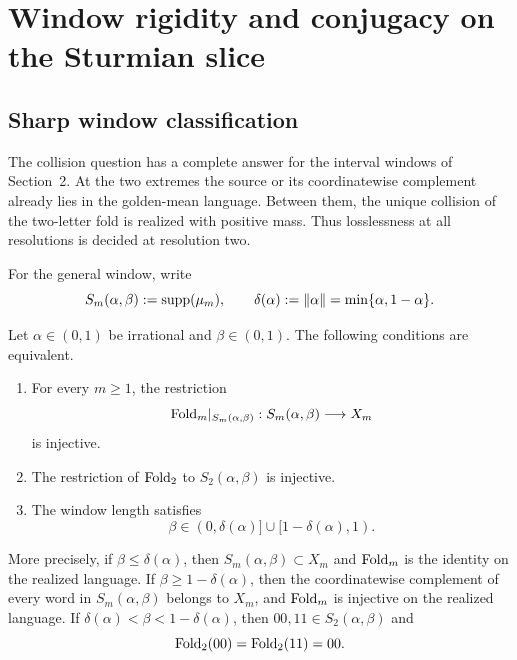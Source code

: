 \section{Window rigidity and conjugacy on the Sturmian slice}

\subsection{Sharp window classification}

The collision question has a complete answer for the interval windows of
Section~2.  At the two extremes the source or its coordinatewise complement
already lies in the golden-mean language.  Between them, the unique collision
of the two-letter fold is realized with positive mass.  Thus losslessness at
all resolutions is decided at resolution two.

For the general window, write
\[
S_m(\alpha,\beta):=\operatorname{supp}(\mu_m),
\qquad
\delta(\alpha):=\|\alpha\|=\min\{\alpha,1-\alpha\}.
\]

\begin{theorem}
\label{thm:window-injectivity-classification}
Let \(\alpha\in(0,1)\) be irrational and \(\beta\in(0,1)\).  The following
conditions are equivalent.
\begin{enumerate}
\item For every \(m\ge1\), the restriction
\[
\mathrm{Fold}_m|_{S_m(\alpha,\beta)}:S_m(\alpha,\beta)\longrightarrow X_m
\]
is injective.
\item The restriction of \(\mathrm{Fold}_2\) to \(S_2(\alpha,\beta)\) is injective.
\item The window length satisfies
\[
\beta\in(0,\delta(\alpha)]\cup[1-\delta(\alpha),1).
\]
\end{enumerate}
More precisely, if \(\beta\le\delta(\alpha)\), then
\(S_m(\alpha,\beta)\subset X_m\) and \(\mathrm{Fold}_m\) is the identity on the
realized language.  If \(\beta\ge1-\delta(\alpha)\), then the coordinatewise
complement of every word in \(S_m(\alpha,\beta)\) belongs to \(X_m\), and
\(\mathrm{Fold}_m\) is injective on the realized language.  If
\(\delta(\alpha)<\beta<1-\delta(\alpha)\), then \(00,11\in
S_2(\alpha,\beta)\) and
\[
\mathrm{Fold}_2(00)=\mathrm{Fold}_2(11)=00.
\]
\end{theorem}

